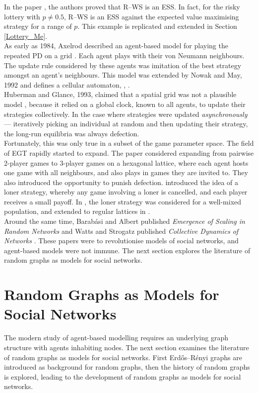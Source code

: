 In the paper \cite{RN30}, the authors proved that R--WS is an ESS. In fact, for the risky lottery with $p \neq 0.5$, R--WS is an ESS against the expected value maximising strategy for a range of $p$. This example is replicated and extended in Section \ref{Lottery_Me}. \\


As early as 1984, Axelrod described an agent-based model for playing the repeated PD on a grid \cite{RN63}. Each agent plays with their von Neumann neighbours. The update rule considered by these agents was imitation of the best strategy amongst an agent's neighbours. This model was extended by Nowak and May, 1992 and defines a cellular automaton, \cite{RN63}, \cite{RN70}. \\



 Huberman and Glance, 1993, claimed that a spatial grid was not a plausible model \cite{RN63}, because it relied on a global clock, known to all agents, to update their strategies collectively. In the case where strategies were updated \emph{asynchronously} --- iteratively picking an individual at random and then updating their strategy, the long-run equilibria was always defection. \\
 
 Fortunately, this was only true in a subset of the game parameter space. The field of EGT rapidly started to expand. The paper \cite{RN45} considered expanding from pairwise 2-player games to 3-player games on a hexagonal lattice, where each agent hosts one game with all neighbours, and also plays in games they are invited to. They also introduced the opportunity to punish defection. \cite{RN66} introduced the idea of a loner strategy, whereby any game involving a loner is cancelled, and each player receives a small payoff. In  \cite{RN67}, the loner strategy was considered for a well-mixed population, and extended to regular lattices in \cite{RN66}. \\
 
 Around the same time, Barab\'{a}si and Albert published \emph{Emergence of Scaling in Random Networks} \cite{RN55} and Watts and Strogatz published \emph{Collective Dynamics of  Networks} \cite{RN58}. These papers were to revolutionise models of social networks, and agent-based models were not immune. The next section explores the literature of random graphs as models for social networks. 
 
 \section{Random Graphs as Models for Social Networks} \label{RG}
  The modern study of agent-based modelling requires an underlying graph structure with agents inhabiting nodes. The next section examines the literature of random graphs as models for social networks. First Erd\H{o}s--R\'enyi graphs are introduced as background for random graphs, then the history of random graphs is explored, leading to the development of random graphs as models for social networks. 
 
